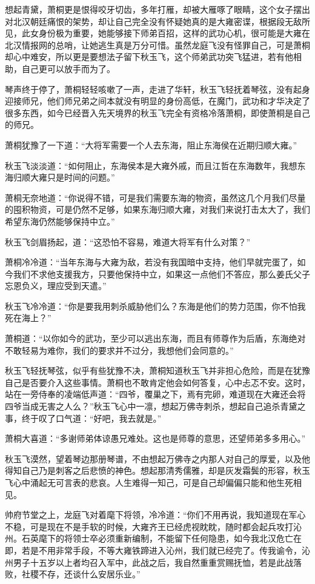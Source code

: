 想起青黛，萧桐更是恨得咬牙切齿，多年打雁，却被大雁啄了眼睛，这个女子摆出对北汉朝廷痛恨的架势，却让自己完全没有怀疑她真的是大雍密谍，根据段无敌所见，此女身份极为重要，她能够接下师弟百招，这样的武功心机，很可能是大雍在北汉情报网的总哨，让她逃生真是万分可惜。虽然龙庭飞没有怪罪自己，可是萧桐却心中难安，所以更是要想法子留下秋玉飞，这个师弟武功突飞猛进，若有他相助，自己更可以放手而为了。

琴声终于停了，萧桐轻轻咳嗽了一声，走进了华轩，秋玉飞轻抚着琴弦，没有起身迎接师兄，他们师兄弟之间本就没有明显的身份高低，在魔门，武功和才华决定了很多东西，如今已经晋入先天境界的秋玉飞完全有资格冷落萧桐，即使萧桐是自己的师兄。

萧桐犹豫了一下道：“大将军需要一个人去东海，阻止东海侯在近期归顺大雍。”

秋玉飞淡淡道：“如何阻止，东海侯本是大雍外戚，而且江哲在东海数年，我想东海归顺大雍只是时间的问题。”

萧桐无奈地道：“你说得不错，可是我们需要东海的物资，虽然这几个月我们尽量的囤积物资，可是仍然不足够，如果东海归顺大雍，对我们来说打击太大了，我们希望东海仍然能够保持中立。”

秋玉飞剑眉扬起，道：“这恐怕不容易，难道大将军有什么对策？”

萧桐冷冷道：“当年东海与大雍为敌，若没有我国暗中支持，他们早就完蛋了，如今我们不求他支援我方，只要他保持中立，如果这一点他们不答应，那么姜氏父子忘恩负义，理应受到天遣。”

秋玉飞冷冷道：“你是要我用刺杀威胁他们么？东海是他们的势力范围，你不怕我死在海上？”

萧桐道：“以你如今的武功，至少可以逃出东海，而且有师尊作为后盾，东海绝对不敢轻易为难你，我们的要求并不过分，我想他们会同意的。”

秋玉飞轻抚琴弦，似乎有些犹豫不决，萧桐知道秋玉飞并非担心危险，而是在犹豫自己是否要介入这些事情。萧桐也不敢肯定他会如何答复，心中忐忑不安。这时，站在一旁侍奉的凌端低声道：“四爷，覆巢之下，焉有完卵，难道现在大雍还会将四爷当成无害之人么？”秋玉飞心中一凛，想起万佛寺刺杀，想起自己追杀青黛之事，终于叹了口气道：“好吧，我去就是。”

萧桐大喜道：“多谢师弟体谅愚兄难处。这也是师尊的意思，还望师弟多多用心。”

秋玉飞漠然，望着琴边那册琴谱，不由想起万佛寺之内那人对自己的厚爱，以及他得知自己乃是刺客之后悲愤的神色。想起那清秀儒雅，却是灰发霜鬓的形容，秋玉飞心中涌起无可言表的悲哀。人生难得一知己，可是自己却偏偏只能和他生死相见。

帅府节堂之上，龙庭飞对着麾下将领，冷冷道：“你们不用再说，我知道现在军心不稳，可是现在不是手软的时候，大雍齐王已经虎视眈眈，随时都会起兵攻打沁州。石英麾下的将领士卒必须重新编制，不能留下任何隐患，如今我北汉危亡在即，若是不用非常手段，不等大雍铁蹄进入沁州，我们就已经完了。传我谕令，沁州男子十五岁以上者均召入军中，此战之后，我自然重重赏赐抚恤，若是此战落败，社稷不存，还谈什么安居乐业。”

